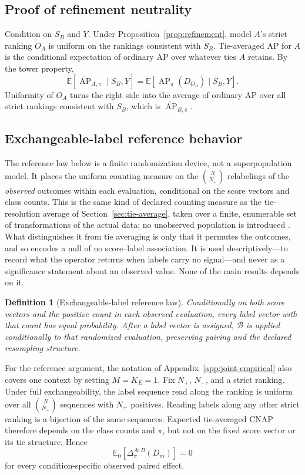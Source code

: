\documentclass[11pt]{article}
\newcommand{\AP}{\operatorname{AP}}
\newcommand{\Boot}{\mathcal{B}}
\newcommand{\E}{\mathbb{E}}
\newcommand{\APta}{\widetilde{\AP}}
\newtheorem{definition}{Definition}
\theoremstyle{remark}
\begin{document}
\subsection{Proof of refinement neutrality}
\label{app:proof-refinement}

Condition on $S_B$ and $Y$. Under Proposition~\ref{prop:refinement}, model
$A$'s strict ranking $O_A$ is uniform on the rankings consistent with $S_B$.
Tie-averaged AP for $A$ is the conditional expectation of ordinary AP over
whatever ties $A$ retains. By the tower property,
\[
\E[\APta_{A,\pi}\mid S_B,Y]
=
\E[\AP_\pi(D_{O_A})\mid S_B,Y].
\]
Uniformity of $O_A$ turns the right side into the average of ordinary AP over
all strict rankings consistent with $S_B$, which is $\APta_{B,\pi}$.

\subsection{Exchangeable-label reference behavior}

The reference law below is a finite randomization device, not a superpopulation
model. It places the uniform counting measure on the $\binom{N}{N_+}$
relabelings of the \emph{observed} outcomes within each evaluation, conditional
on the score vectors and class counts. This is the same kind of declared
counting measure as the tie-resolution average of
Section~\ref{sec:tie-average}, taken over a finite, enumerable set of
transformations of the actual data; no unobserved population is introduced
\cite{fisher1935design,pitman1937significance}. What distinguishes it from tie
averaging is only that it permutes the outcomes, and so encodes a null of no
score--label association. It is used descriptively---to record what the operator
returns when labels carry no signal---and never as a significance statement
about an observed value. None of the main results depends on it.

\begin{definition}[Exchangeable-label reference law]
Conditionally on both score vectors and the positive count in each observed
evaluation, every label vector with that count has equal probability. After a
label vector is assigned, $\Boot$ is applied conditionally to that randomized
evaluation, preserving pairing and the declared resampling structure.
\end{definition}

For the reference argument, the notation of Appendix~\ref{app:joint-empirical}
also covers one context by setting $M=K_E=1$.
Fix $N_+$, $N_-$, and a strict ranking. Under full exchangeability, the label
sequence read along the ranking is uniform over all $\binom N{N_+}$ sequences
with $N_+$ positives. Reading labels along any other strict ranking is a
bijection of the same sequences. Expected tie-averaged CNAP therefore depends
on the class counts and $\pi$, but not on the fixed score vector or its tie
structure. Hence
\begin{equation}
\E_0[\Delta^{A:B}_\pi(D_m)]=0
\label{eq:reference-cell}
\end{equation}
for every condition-specific observed paired effect.
\end{document}
